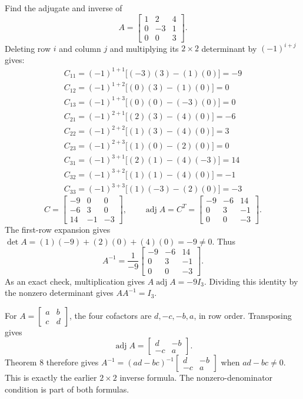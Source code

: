 \goal Find the adjugate and inverse of
\[A=\begin{bmatrix}1&2&4\\0&-3&1\\0&0&3\end{bmatrix}.\]
Deleting row $i$ and column $j$ and multiplying its $2\times2$ determinant by $(-1)^{i+j}$ gives:
\[\begin{gathered}
C_{11}=(-1)^{1+1}\big[(-3)(3)-(1)(0)\big]=-9\\C_{12}=(-1)^{1+2}\big[(0)(3)-(1)(0)\big]=0\\C_{13}=(-1)^{1+3}\big[(0)(0)-(-3)(0)\big]=0\\C_{21}=(-1)^{2+1}\big[(2)(3)-(4)(0)\big]=-6\\C_{22}=(-1)^{2+2}\big[(1)(3)-(4)(0)\big]=3\\C_{23}=(-1)^{2+3}\big[(1)(0)-(2)(0)\big]=0\\C_{31}=(-1)^{3+1}\big[(2)(1)-(4)(-3)\big]=14\\C_{32}=(-1)^{3+2}\big[(1)(1)-(4)(0)\big]=-1\\C_{33}=(-1)^{3+3}\big[(1)(-3)-(2)(0)\big]=-3
\end{gathered}\]
\[C=\begin{bmatrix}-9&0&0\\-6&3&0\\14&-1&-3\end{bmatrix},\qquad\operatorname{adj}A=C^T=\begin{bmatrix}-9&-6&14\\0&3&-1\\0&0&-3\end{bmatrix}.\]
The first-row expansion gives $\det A=(1)(-9) + (2)(0) + (4)(0)=-9\ne0$. Thus
\[A^{-1}=\frac{1}{-9}\begin{bmatrix}-9&-6&14\\0&3&-1\\0&0&-3\end{bmatrix}.\]
As an exact check, multiplication gives $A\operatorname{adj}A=-9I_3$. Dividing this identity by the nonzero determinant gives $AA^{-1}=I_3$.


For $A=\left[\begin{smallmatrix}a&b\\c&d\end{smallmatrix}\right]$, the four cofactors are $d,-c,-b,a$, in row order. Transposing gives
\[
\operatorname{adj}A=\begin{bmatrix}d&-b\\-c&a\end{bmatrix}.
\]
Theorem 8 therefore gives $A^{-1}=(ad-bc)^{-1}\left[\begin{smallmatrix}d&-b\\-c&a\end{smallmatrix}\right]$ when $ad-bc\ne0$. This is exactly the earlier $2\times2$ inverse formula. The nonzero-denominator condition is part of both formulas.

